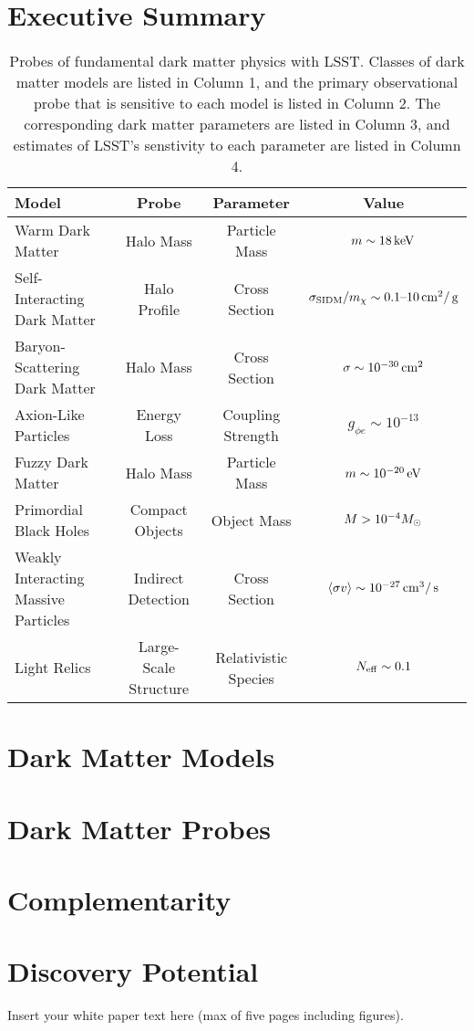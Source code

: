 \documentclass[12pt]{article}
\begin{document}
\pagebreak

\section*{Executive Summary}

\begin{table}[h]
\small
\begin{center}
\begin{tabular}{l c c c}
\hline 
Model & Probe & Parameter & Value \\
\hline 
\hline
Warm Dark Matter  & Halo Mass & Particle Mass & $m \sim 18 \mathrm{\,keV}$ \\
Self-Interacting Dark Matter & Halo Profile & Cross Section & $\sigma_{\rm SIDM}/m_\chi \sim 0.1\text{--}10\mathrm{\,cm}^2/\mathrm{\,g}$ \\
Baryon-Scattering Dark Matter & Halo Mass & Cross Section & $\sigma \sim 10^{-30} \mathrm{\,cm}^2$ \\
Axion-Like Particles & Energy Loss & Coupling Strength & $g_{\phi e} \sim 10^{-13} $ \\
Fuzzy Dark Matter & Halo Mass & Particle Mass & $m \sim 10^{-20} \mathrm{\,eV}$  \\
Primordial Black Holes  & Compact Objects & Object Mass & $M > 10^{-4} M_\odot$ \\
Weakly Interacting Massive Particles & Indirect Detection & Cross Section & $\langle \sigma v \rangle \sim 10^{-27} \mathrm{\,cm}^3/\mathrm{\,s}$ \\
Light Relics & Large-Scale Structure & Relativistic Species & $N_{\rm eff} \sim 0.1$ \\[+0.5em]
\hline
\end{tabular}
\end{center}
\caption{\label{tab:models} Probes of fundamental dark matter physics with LSST. Classes of dark matter models are listed in Column 1, and the primary observational probe that is sensitive to each model is listed in Column 2. The corresponding dark matter parameters are listed in Column 3, and estimates of LSST's senstivity to each parameter are listed in Column 4.}
\end{table}


\section*{Dark Matter Models}

\section*{Dark Matter Probes}

\section*{Complementarity}

\section*{Discovery Potential}



Insert your white paper text here (max of five pages including figures).

\pagebreak

\def\bibname{References}
\begingroup
  \small
  \setlength{\bibsep}{0pt plus 0.5ex}
  
  
\endgroup
\end{document}
